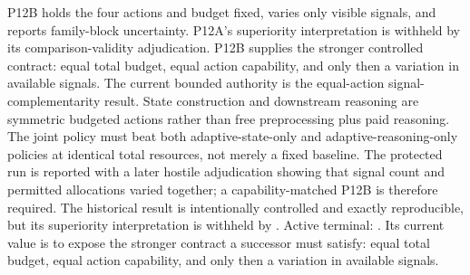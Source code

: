  P12B holds the four actions and budget fixed, varies only visible signals, and reports family-block uncertainty.\markdownRendererOlItemEnd
\markdownRendererOlEndTight \markdownRendererInterblockSeparator
{}P12A's superiority interpretation is withheld by its comparison-validity adjudication. P12B supplies the stronger controlled contract: equal total budget, equal action capability, and only then a variation in available signals. The current bounded authority is the equal-action signal-complementarity result.
 State construction and downstream reasoning are symmetric budgeted actions rather than free preprocessing plus paid reasoning.\markdownRendererOlItemEnd 
{} The joint policy must beat both adaptive-state-only and adaptive-reasoning-only policies at identical total resources, not merely a fixed baseline.\markdownRendererOlItemEnd 
{} The protected run is reported with a later hostile adjudication showing that signal count and permitted allocations varied together; a capability-matched P12B is therefore required.\markdownRendererOlItemEnd 
\markdownRendererOlEndTight \markdownRendererInterblockSeparator
{}The historical result is intentionally controlled and exactly reproducible, but its superiority interpretation is withheld by . Active terminal: . Its current value is to expose the stronger contract a successor must satisfy: equal total budget, equal action capability, and only then a variation in available signals.
\markdownRendererSectionEnd \markdownRendererDocumentEnd